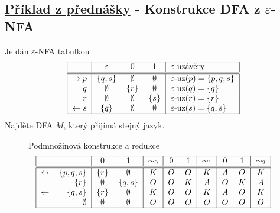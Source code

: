 \subsection{\href{https://youtu.be/Hbi2ao1mFBc?list=PLQL6z4JeTTQkLuzI78OTnfYBclE1g0UjS&t=1823}{Příklad z přednášky} - Konstrukce DFA z \texorpdfstring{$\varepsilon$}{e}-NFA}
Je dán $\varepsilon$-NFA tabulkou
\[
    \begin{tabular}{|r|c c c|l|}
        \hline
        & $\varepsilon$ & $0$ & $1$ & $\varepsilon$-uzávěry \\ \hline \hline
        $\rightarrow p$& $\bc{q,s}$  & $\emptyset$ & $\emptyset$ & $\varepsilon\text{-uz}(p) = \bc{p,q,s}$ \\
        $q$            & $\emptyset$ & $\bc{r}$    & $\emptyset$ & $\varepsilon\text{-uz}(q) = \bc{q}$ \\
        $r$            & $\emptyset$ & $\emptyset$ & $\bc{s}$    & $\varepsilon\text{-uz}(r) = \bc{r}$ \\
        $\leftarrow s$ & $\bc{q}$    & $\emptyset$ & $\emptyset$ & $\varepsilon\text{-uz}(s) = \bc{q,s}$\\
        \hline
    \end{tabular}
\]
Najděte DFA $M$, který přijímá stejný jazyk.
\begin{figure}[H]
    \begin{minipage}[c]{0.7\textwidth}
        Podmnožinová konstrukce a redukce
        \[
            \begin{tabular}{|r r|c c|c|c c|c|c c|c|c c|c|}
                \hline
                & $ $ & $0$ & $1$ & $\sim_0$ & $0$ & $1$ & $\sim_1$ & $0$ & $1$ & $\sim_2$ \\ \hline \hline
                $\leftrightarrow$ &$\bc{p,q,s}$ & $\bc{r}$& $\emptyset$ & $K$ & $O$ & $O$ & $K$ & $A$ & $O$ & $K$ \\
                            &$\bc{r}$     & $\emptyset$ & $\bc{q,s}$  & $O$ & $O$ & $K$ & $A$ & $O$ & $K$ & $A$ \\
                $\leftarrow$  &$\bc{q,s}$   & $\bc{r}$    & $\emptyset$ & $K$ & $O$ & $O$ & $K$ & $A$ & $O$ & $K$ \\
                            &$\emptyset$  & $\emptyset$ & $\emptyset$ & $O$ & $O$ & $O$ & $O$ & $O$ & $O$ & $O$ \\
                \hline
            \end{tabular}
        \]
    \end{minipage}%
    \begin{minipage}[c]{0.3\textwidth}
    \end{minipage}
\end{figure}

